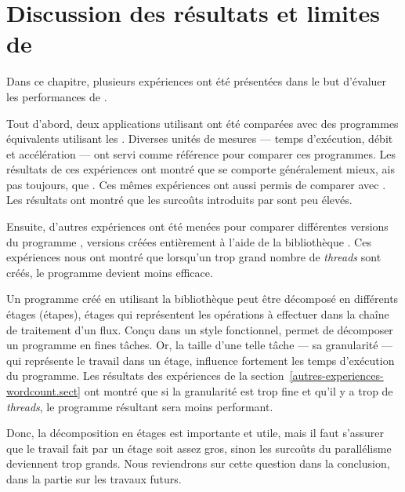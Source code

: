 \section{Discussion des résultats et limites de \ppff}
\label{limitesppff.sect}

Dans ce chapitre, plusieurs exp\'eriences ont \'et\'e présentées dans le but d'évaluer les performances de .

Tout d'abord, deux applications utilisant  ont \'et\'e compar\'ees avec des programmes  \'equivalents utilisant les . Diverses unit\'es de mesures --– temps d'ex\'ecution, d\'ebit et acc\'elération --- ont servi comme r\'ef\'erence pour comparer ces programmes. Les r\'esultats de ces exp\'eriences ont montr\'e que  se comporte généralement mieux, ais pas toujours, que . 
%
Ces mêmes exp\'eriences ont aussi permis de comparer  avec . Les r\'esultats ont montr\'e que les surco\^uts introduits par  sont peu \'elev\'es.


Ensuite, d'autres exp\'eriences ont \'et\'e men\'ees pour comparer diff\'erentes versions du programme , versions cr\'e\'ees enti\`erement \`a l'aide de la biblioth\`eque .
%
%
Ces expériences nous ont montré que lorsqu'un trop grand nombre de
\emph{threads} sont créés, le programme devient moins efficace.

Un programme cr\'e\'e en utilisant la biblioth\`eque  peut \^etre d\'ecompos\'e en diff\'erents \'etages (\'etapes), \'etages qui repr\'esentent les op\'erations à effectuer dans la cha\^ine de traitement d'un flux. Con\c{c}u dans un style fonctionnel,  permet de d\'ecomposer un programme en fines t\^aches. Or, la taille d'une telle t\^ache --- sa granularit\'e --- qui repr\'esente le travail dans un \'etage, influence fortement les temps d'ex\'ecution du programme. Les r\'esultats des exp\'eriences de la section~\ref{autres-experiences-wordcount.sect} ont montr\'e que si la granularit\'e est trop fine et qu'il y a trop de \emph{threads}, le programme résultant sera moins performant. 

Donc, la d\'ecomposition en \'etages est importante et utile, mais il faut s'assurer que le travail fait par un \'etage soit assez gros, sinon les surco\^uts du parall\'elisme deviennent trop grands.
%
Nous reviendrons sur cette question dans la conclusion, dans la partie sur les travaux futurs.

